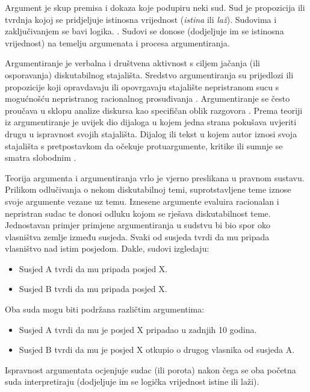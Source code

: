 Argument je skup premisa i dokaza koje podupiru neki sud. Sud je propozicija
ili tvrdnja  kojoj se pridjeljuje istinosna vrijednost
(\emph{istina} ili \emph{laž}). Sudovima i zaključivanjem se bavi logika.
\citep{vukovic2007matematicka}. Sudovi se donose (dodjeljuje im se istinosna
vrijednost) na temelju argumenata i procesa argumentiranja.  

Argumentiranje je verbalna i društvena aktivnost s ciljem jačanja (ili
osporavanja) diskutabilnog stajališta. Sredstvo argumentiranja su prijedlozi
ili propozicije  koji opravdavaju ili opovrgavaju stajalište
nepristranom sucu s mogućnošću nepristranog racionalnog prosuđivanja
\citep{rahwan2006representing}. Argumentiranje se često proučava u sklopu
analize diskursa kao specifičan oblik razgovora \citep{palau2009argumentation}.
Prema teoriji iz \citep{van2003systematic} argumentiranje je uvijek dio
dijaloga u kojem jedna strana pokušava uvjeriti drugu u ispravnost svojih
stajališta. Dijalog ili tekst u kojem autor iznosi svoja stajališta s
pretpostavkom da očekuje protuargumente, kritike ili sumnje se smatra slobodnim
. 

Teorija argumenta i argumentiranja vrlo je vjerno preslikana u pravnom sustavu.
Prilikom odlučivanja o nekom diskutabilnoj temi, suprotstavljene teme iznose
svoje argumente vezane uz temu. Iznesene argumente evaluira racionalan i
nepristran sudac te donosi odluku kojom se rješava diskutabilnost teme.
Jednostavan primjer primjene argumentiranja u sudstvu bi bio spor oko
vlasništva zemlje između susjeda. Svaki od susjeda tvrdi da mu pripada
vlasništvo nad istim posjedom. Dakle, sudovi izgledaju:

\begin{itemize} 
    \item Susjed A tvrdi da mu pripada posjed X.  
    \item Susjed B
tvrdi da mu pripada posjed X.  
\end{itemize}

Oba suda mogu biti podržana različtim argumentima:

\begin{itemize} 
    \item Susjed A tvrdi da mu je posjed X pripadao u zadnjih 10 godina.  
    \item Susjed B tvrdi da mu je posjed X otkupio o drugog vlasnika od susjeda A.  
\end{itemize}

Ispravnost argumentata ocjenjuje sudac (ili porota) nakon čega se oba početna
suda interpretiraju (dodjeljuje im se logička vrijednost istine ili laži).  

